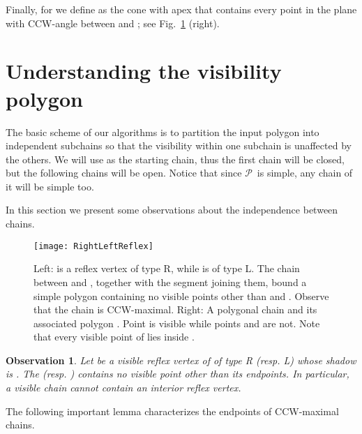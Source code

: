 \documentclass[a4paper]{article}
\newtheorem{observation}{Observation}
\newcommand{\Poly}{\ensuremath{\mathcal{P}}}               \newcommand{\bd}{\ensuremath{\partial \Poly} }                 \newcommand{\Vis}{\ensuremath{\mathrm{Vis}_\Poly}} \newcommand{\VisC}{\ensuremath{\mathrm{Vis}_{\mathcal{C}}}} \newcommand{\VisCprime}{\ensuremath{\mathrm{Vis}_{\mathcal{C'}}}} \newcommand{\E}{\ensuremath{\mathrm{E}}}                    \newcommand{\Rin}{\ensuremath{r}}      \newcommand{\Rout}{\ensuremath{\bar{r}}}      \newcommand{\Hout}{\ensuremath{\bar{h}}}      \newcommand{\chain}{\ensuremath{{\mathrm{Chain}}}}     \newcommand{\region}{\ensuremath{{{\mathcal R}}}}
\begin{document}
Finally, for   we define  as the cone with apex  that contains every point in the plane with CCW-angle between  and ; see Fig.~\ref{fig:RightLeftReflex and ConeDefs} (right).




\section{Understanding the visibility polygon}
\label{sec:SimpleAlgorithm}
The basic scheme of our algorithms is to partition the input polygon into independent subchains so that the visibility within one subchain is unaffected by the others. We will use  as the starting chain, thus the first chain will be closed, but the following chains will be open. Notice that since \Poly\ is simple, any chain of it will be simple too. 

In this section we present some observations about the independence between chains.


\begin{figure}[tb]
\centering
\texttt{[image: RightLeftReflex]}
\caption{\small Left:  is a reflex vertex of type R, while  is of type L. The chain between  and , together with the segment joining them, bound a simple polygon containing no visible points other than  and .  Observe that the chain  is CCW-maximal. 
Right: A polygonal chain  and its associated polygon . Point  is visible while points  and  are not. 
Note that every visible point of  lies inside .}
\label{fig:RightLeftReflex and ConeDefs}
\end{figure}

\begin{observation}\label{obs:VisibleChains}
Let  be a visible reflex vertex of  of type R (resp. L) whose shadow is . The  (resp. ) contains no visible point other than its endpoints. In particular, a visible chain cannot contain an interior reflex vertex.
\end{observation}








The following important lemma characterizes the endpoints of CCW-maximal chains.
\end{document}
